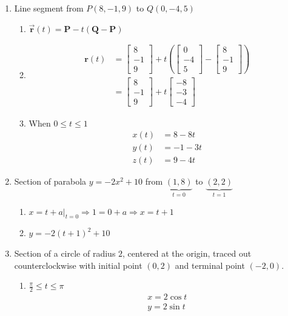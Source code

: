 \documentclass[letter,11pt]{article}
\begin{document}
\begin{enumerate}[label=\Alph*.]
    \item Line segment from $P(8, -1, 9)$ to $Q(0, -4, 5)$
    \begin{enumerate}
        \item $\vec{\mathbf{r}}(t) = \mathbf{P}-t(\mathbf{Q}-\mathbf{P})$
        \item \begin{align*}\mathbf{r}(t) &= \begin{bmatrix} 8 \\ -1 \\ 9 \end{bmatrix} + t \left( \begin{bmatrix} 0 \\ -4 \\ 5 \end{bmatrix} - \begin{bmatrix} 8 \\ -1 \\ 9 \end{bmatrix} \right)\\ &=  \begin{bmatrix} 8 \\ -1 \\ 9 \end{bmatrix} + t \begin{bmatrix} -8 \\ -3 \\ -4 \end{bmatrix} \end{align*}
    \item When $0\leq t \leq 1$\begin{align*} x(t) &= 8 - 8t \\ y(t) &= -1 - 3t \\ z(t) &= 9 - 4t \end{align*}
    \end{enumerate}
    \item Section of parabola $y = -2x^2 + 10$ from $\underbrace{(1, 8)}_{t=0}$ to $\underbrace{(2, 2)}_{t=1}$
    \begin{enumerate}
        \item $x=t+a\rvert_{t=0} \Longrightarrow 1 = 0+a \Longrightarrow x = t+1$
        \item $y = -2(t+1)^2+10$
    \end{enumerate}
    \item Section of a circle of radius $2$, centered at the origin, traced out counterclockwise with initial point $(0, 2)$ and terminal point $(-2, 0)$.
    \begin{enumerate}
        \item $\frac{\pi}{2} \leq t \leq \pi$ \begin{align*}
            x = 2\cos t\\
            y=2\sin t
        \end{align*}
    \end{enumerate}
\end{enumerate}
\end{document}
